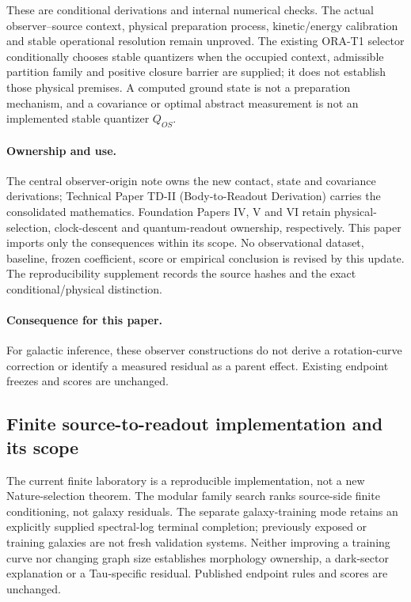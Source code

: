 \documentclass[11pt]{article}
\begin{document}
These are conditional derivations and internal numerical checks. The actual
observer--source context, physical preparation process, kinetic/energy
calibration and stable operational resolution remain unproved. The existing
ORA-T1 selector conditionally chooses stable quantizers when the occupied
context, admissible partition family and positive closure barrier are supplied;
it does not establish those physical premises. A computed ground state is not
a preparation mechanism, and a covariance or optimal abstract measurement is
not an implemented stable quantizer $Q_{OS}$.

\paragraph{Ownership and use.}
The central observer-origin note owns the new contact, state and covariance
derivations; Technical Paper TD-II (Body-to-Readout Derivation) carries the consolidated
mathematics. Foundation Papers IV, V and VI retain physical-selection,
clock-descent and quantum-readout ownership, respectively. This paper imports
only the consequences within its scope. No observational dataset, baseline,
frozen coefficient, score or empirical conclusion is revised by this update.
The reproducibility supplement records the source hashes and the exact
conditional/physical distinction.

\paragraph{Consequence for this paper.}
For galactic inference, these observer constructions do not derive a rotation-curve correction or identify a measured residual as a parent effect. Existing endpoint freezes and scores are unchanged.

\subsection{Finite source-to-readout implementation and its scope}
The current finite laboratory is a reproducible implementation, not a new Nature-selection theorem. The modular family search ranks source-side finite conditioning, not galaxy residuals. The separate galaxy-training mode retains an explicitly supplied spectral-log terminal completion; previously exposed or training galaxies are not fresh validation systems. Neither improving a training curve nor changing graph size establishes morphology ownership, a dark-sector explanation or a Tau-specific residual. Published endpoint rules and scores are unchanged.
\end{document}
